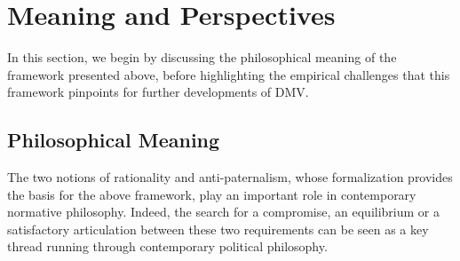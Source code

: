 \documentclass[version=3.21, pagesize, twoside=off, bibliography=totoc, DIV=calc, fontsize=12pt, a4paper, french, english]{scrartcl}
\begin{document}

\section{Meaning and Perspectives}
\label{disc}
In this section, we begin by discussing the philosophical meaning of the framework presented above, before highlighting the empirical challenges that this framework pinpoints for further developments of \ac{DMV}.

\subsection{Philosophical Meaning}
The two notions of rationality and anti-paternalism, whose formalization provides the basis for the above framework, play an important role in contemporary normative philosophy. 
Indeed, the search for a compromise, an equilibrium or a satisfactory articulation between these two requirements can be seen as a key thread running through contemporary political philosophy.
\end{document}
